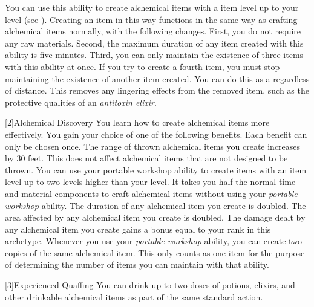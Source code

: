         You can use this ability to create alchemical items with a item level up to your level (see ).
        Creating an item in this way functions in the same way as crafting alchemical items normally, with the following changes.
        First, you do not require any raw materials.
        Second, the maximum duration of any item created with this ability is five minutes.
        Third, you can only maintain the existence of three items with this ability at once.
        If you try to create a fourth item, you must stop maintaining the existence of another item created.
        You can do this as a  regardless of distance.
        This removes any lingering effects from the removed item, such as the protective qualities of an \textit{antitoxin elixir}.

        [2]{Alchemical Discovery} You learn how to create alchemical items more effectively.
        You gain your choice of one of the following benefits.
        Each benefit can only be chosen once.
        {
             The range of thrown alchemical items you create increases by 30 feet.
                This does not affect alchemical items that are not designed to be thrown.
             You can use your portable workshop ability to create items with an item level up to two levels higher than your level.
             It takes you half the normal time and material components to craft alchemical items without using your \textit{portable workshop} ability.
             The duration of any alchemical item you create is doubled.
             The area affected by any alchemical item you create is doubled.
             The damage dealt by any alchemical item you create gains a bonus equal to your rank in this archetype.
             Whenever you use your \textit{portable workshop} ability, you can create two copies of the same alchemical item.
            This only counts as one item for the purpose of determining the number of items you can maintain with that ability.
        }

        [3]{Experienced Quaffing} You can drink up to two doses of potions, elixirs, and other drinkable alchemical items as part of the same standard action.

